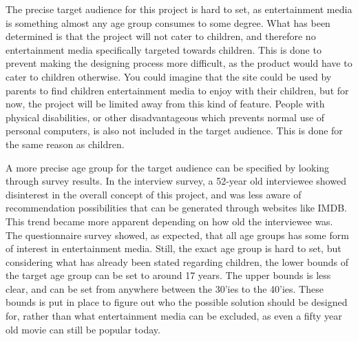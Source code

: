 The precise target audience for this project is hard to set, as entertainment media is something almost any age group consumes to some degree. What has been determined is that the project will not cater to children, and therefore no entertainment media specifically targeted towards children. This is done to prevent making the designing process more difficult, as the product would have to cater to children otherwise. You could imagine that the site could be used by parents to find children entertainment media to enjoy with their children, but for now, the project will be limited away from this kind of feature. People with physical disabilities, or other disadvantageous which prevents normal use of personal computers, is also not included in the target audience. This is done for the same reason as children.

A more precise age group for the target audience can be specified by looking through survey results. In the interview survey, a 52-year old interviewee showed disinterest in the overall concept of this project, and was less aware of recommendation possibilities that can be generated through websites like IMDB. This trend became more apparent depending on how old the interviewee was. The questionnaire survey showed, as expected, that all age groups has some form of interest in entertainment media. Still, the exact age group is hard to set, but considering what has already been stated regarding children, the lower bounds of the target age group can be set to around 17 years. The upper bounds is less clear, and can be set from anywhere between the 30’ies to the 40’ies. These bounds is put in place to figure out who the possible solution should be designed for, rather than what entertainment media can be excluded, as even a fifty year old movie can still be popular today.